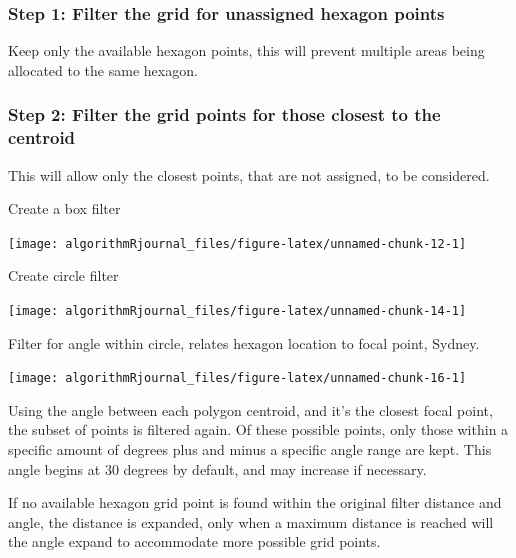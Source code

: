 \hypertarget{step-1-filter-the-grid-for-unassigned-hexagon-points}{%
\subsubsection{Step 1: Filter the grid for unassigned hexagon
points}\label{step-1-filter-the-grid-for-unassigned-hexagon-points}}

Keep only the available hexagon points, this will prevent multiple areas
being allocated to the same hexagon.

\hypertarget{step-2-filter-the-grid-points-for-those-closest-to-the-centroid}{%
\subsubsection{Step 2: Filter the grid points for those closest to the
centroid}\label{step-2-filter-the-grid-points-for-those-closest-to-the-centroid}}

This will allow only the closest points, that are not assigned, to be
considered.

Create a box filter

\begin{Schunk}

\texttt{[image: algorithmRjournal\_files/figure-latex/unnamed-chunk-12-1]} \end{Schunk}

Create circle filter

\begin{Schunk}

\texttt{[image: algorithmRjournal\_files/figure-latex/unnamed-chunk-14-1]} \end{Schunk}

Filter for angle within circle, relates hexagon location to focal point,
Sydney.

\begin{Schunk}

\texttt{[image: algorithmRjournal\_files/figure-latex/unnamed-chunk-16-1]} \end{Schunk}

Using the angle between each polygon centroid, and it's the closest
focal point, the subset of points is filtered again. Of these possible
points, only those within a specific amount of degrees plus and minus a
specific angle range are kept. This angle begins at 30 degrees by
default, and may increase if necessary.

If no available hexagon grid point is found within the original filter
distance and angle, the distance is expanded, only when a maximum
distance is reached will the angle expand to accommodate more possible
grid points.

